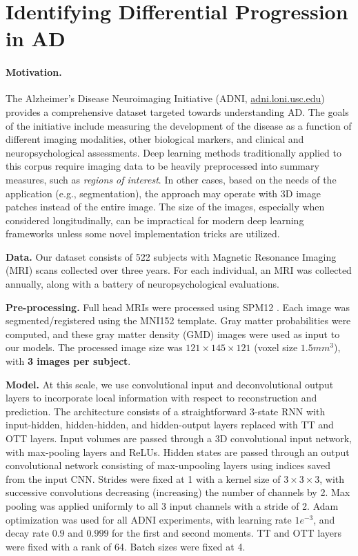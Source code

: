 \section{Identifying Differential Progression in AD}\label{sec:adni}
\paragraph{Motivation.} The Alzheimer's Disease Neuroimaging Initiative (ADNI, \url{adni.loni.usc.edu})  provides a comprehensive dataset
targeted towards understanding AD. The goals of the initiative include measuring the development of the disease as a function of different imaging modalities, other biological markers, and clinical and neuropsychological assessments. 
Deep learning methods traditionally applied to this corpus require imaging data to be heavily preprocessed into summary measures, such as \textit{regions of interest}.
In other cases, based on the needs of the application (e.g., segmentation),
the approach may operate with 3D image patches instead of the entire image. 
The size of the images, especially when considered longitudinally, can be impractical for modern deep learning frameworks unless some novel
implementation tricks are utilized. 

\textbf{Data.} Our dataset consists of 522 subjects with Magnetic Resonance Imaging (MRI) scans collected over three years. For each individual, an MRI was collected annually, along with a battery of neuropsychological evaluations.

\textbf{Pre-processing.}
Full head MRIs were processed using SPM12 \cite{ashburner2014spm12}. Each image was segmented/registered using the MNI152 template. Gray matter probabilities were computed, and these gray matter density (GMD) images were used as input to our models.
The processed image size was $121 \times 145 \times 121$ (voxel size $1.5mm^3$), with \textbf{3 images per subject}.

\textbf{Model.} At this scale, we use convolutional input and deconvolutional output layers to incorporate local information with respect to reconstruction and prediction. The architecture consists of a straightforward 3-state RNN with input-hidden, hidden-hidden, and hidden-output layers replaced with TT and OTT layers. Input volumes are passed through a 3D convolutional input network, with max-pooling layers and ReLUs.
Hidden states are passed through an output convolutional network consisting of max-unpooling layers using indices
saved from the input CNN.
Strides were fixed at 1 with a kernel size of $3\times 3 \times 3$,
with successive convolutions decreasing (increasing) the number of channels by 2.
Max pooling was applied uniformly to all 3 input channels with a stride of 2. Adam optimization \citep{kingma2014adam} was used for all
ADNI experiments, with learning rate $1e^{-3}$, and decay rate $0.9$ and $0.999$ for the first and second moments. TT and OTT layers were fixed with a rank of 64. Batch sizes were fixed at 4.


